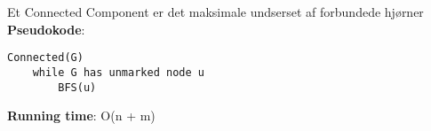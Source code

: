 Et Connected Component er det maksimale undserset af forbundede hjørner\\
\textbf{Pseudokode}:
\begin{lstlisting}[frame=single, mathescape=true]
Connected(G)
	while G has unmarked node u
		BFS(u)
\end{lstlisting}
\textbf{Running time}: O(n + m)
